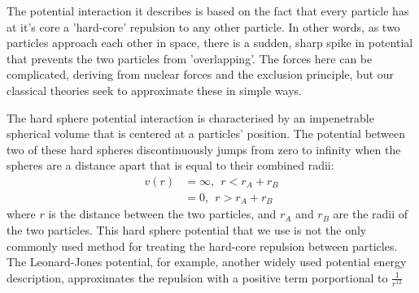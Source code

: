 The potential interaction it describes is based on the fact that every
particle has at it's core a 'hard-core' repulsion to any other
particle.  In other words, as two particles approach each other in
space, there is a sudden, sharp spike in potential that prevents the
two particles from 'overlapping'.  The forces here can be complicated,
deriving from nuclear forces and the exclusion principle, but our
classical theories seek to approximate these in simple ways.

The hard sphere potential interaction is characterised by an
impenetrable spherical volume that is centered at a particles'
position.  The potential between two of these hard spheres
discontinuously jumps from zero to infinity when the spheres are a
distance apart that is equal to their combined radii:
\begin{align}
  v(r) &= \infty,~~ r < r_A + r_B \\
  &= 0,~~ r > r_A + r_B
\end{align}
where $r$ is the distance between the two particles, and $r_A$ and
$r_B$ are the radii of the two particles.  This hard sphere potential
that we use is not the only commonly used method for treating the
hard-core repulsion between particles.  The Leonard-Jones potential,
for example, another widely used potential energy description,
approximates the repulsion with a positive term porportional to
$\frac{1}{r^{12}}$



